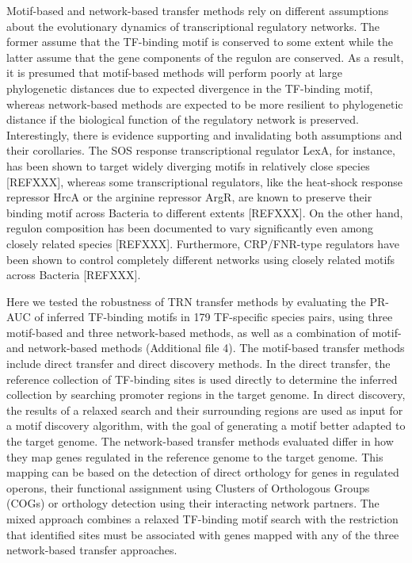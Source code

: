 Motif-based and network-based transfer methods rely on different assumptions
about the evolutionary dynamics of transcriptional regulatory networks. The
former assume that the TF-binding motif is conserved to some extent while the
latter assume that the gene components of the regulon are conserved. As a
result, it is presumed that motif-based methods will perform poorly at large
phylogenetic distances due to expected divergence in the TF-binding motif,
whereas network-based methods are expected to be more resilient to phylogenetic
distance if the biological function of the regulatory network is
preserved. Interestingly, there is evidence supporting and invalidating both
assumptions and their corollaries. The SOS response transcriptional regulator
LexA, for instance, has been shown to target widely diverging motifs in
relatively close species [REFXXX], whereas some transcriptional regulators,
like the heat-shock response repressor HrcA or the arginine repressor ArgR, are
known to preserve their binding motif across Bacteria to different extents
[REFXXX]. On the other hand, regulon composition has been documented to vary
significantly even among closely related species [REFXXX]. Furthermore,
CRP/FNR-type regulators have been shown to control completely different
networks using closely related motifs across Bacteria [REFXXX].

Here we tested the robustness of TRN transfer methods by evaluating the PR-AUC
of inferred TF-binding motifs in 179 TF-specific species pairs, using three
motif-based and three network-based methods, as well as a combination of motif-
and network-based methods (Additional file 4). The motif-based transfer methods
include direct transfer and direct discovery methods. In the direct transfer,
the reference collection of TF-binding sites is used directly to determine the
inferred collection by searching promoter regions in the target genome. In
direct discovery, the results of a relaxed search and their surrounding regions
are used as input for a motif discovery algorithm, with the goal of generating
a motif better adapted to the target genome. The network-based transfer methods
evaluated differ in how they map genes regulated in the reference genome to the
target genome. This mapping can be based on the detection of direct orthology
for genes in regulated operons, their functional assignment using Clusters of
Orthologous Groups (COGs) or orthology detection using their interacting
network partners. The mixed approach combines a relaxed TF-binding motif search
with the restriction that identified sites must be associated with genes mapped
with any of the three network-based transfer approaches.

